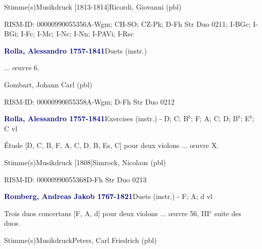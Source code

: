 \documentclass[twocolumn]{book}
\begin{document}
\par \textcolor{darkblue}{}  Stimme(s)\newline Musikdruck  [1813-1814]\newline Ricordi, Giovanni  (pbl)
\par RISM-ID: 00000990055356\newline A-Wgm; CH-SO; CZ-Pk; D-Fh  Str Duo 0211; I-BGc; I-BGi; I-Fc; I-Mc; I-Nc; I-Nn; I-PAVi; I-Rsc
\par \vspace{7pt} \textcolor{darkblue}{\textbf{Rolla, Alessandro  1757-1841}}\hfillplus{\textbf{[321]}}\newline Duets (instr.)
\par \begin{itshape}... œuvre 6.\end{itshape} \newline Gombart, Johann Carl  (pbl)
\par RISM-ID: 00000990055358\newline A-Wgm; D-Fh  Str Duo 0212
\par \vspace{7pt} \textcolor{darkblue}{\textbf{Rolla, Alessandro  1757-1841}}\hfillplus{\textbf{[322]}}\newline Exercises (instr.) - D; C; B$^b$; F; A; C; D; B$^b$; E$^b$; C vl
\par \begin{itshape}Étude [D, C, B, F, A, C, D, B, Es, C] pour deux violons ... œuvre X.\end{itshape} 
\par \textcolor{darkblue}{}  Stimme(s)\newline Musikdruck  [1808]\newline Simrock, Nicolaus  (pbl)
\par RISM-ID: 00000990055368\newline D-Fh  Str Duo 0213
\par \vspace{7pt} \textcolor{darkblue}{\textbf{Romberg, Andreas Jakob  1767-1821}}\hfillplus{\textbf{[323]}}\newline Duets (instr.) - F; A; d vl
\par \begin{itshape}Trois duos concertans [F, A, d] pour deux violons ... œuvre 56, III$^e$ suite des duos.\end{itshape} 
\par \textcolor{darkblue}{}  Stimme(s)\newline Musikdruck\newline Peters, Carl Friedrich  (pbl)
\end{document}

